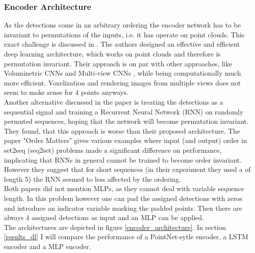 \documentclass[12pt,a4paper]{article}
\begin{document}
\subsubsection{Encoder Architecture}
\label{encoder}
As the detections come in an arbitrary ordering the encoder network has to be invariant to permutations of the inputs, i.e. it has operate on point clouds. This exact challenge is discussed in \cite{PointNet}. The authors designed an effective and efficient deep learning architecture, which works on point clouds and therefore is permutation invariant. Their approach is on par with other approaches, like Voluminetric CNNs \cite{VCNN} and Multi-view CNNs \cite{MVCNN}, while being computationally much more efficient. Voxelization and rendering images from multiple views does not seem to make sense for 4 points anyways.\\
Another alternative discussed in the paper is treating the detections as a sequential signal and training a Recurrent Neural Network (RNN) on randomly permuted sequences, hoping that the network will become permutation invariant. They found, that this approach is worse than their proposed architecture. The paper "Order Matters" \cite{orderMatters} gives various examples where input (and output) order in set2seq (seq2set) problems made a significant difference on performance, implicating that RNNs in general cannot be trained to become order invariant. However they suggest that for short  sequences (in their experiment they used a of length 5) the RNN seemed to less affected by the ordering.\\
Both papers did not mention MLPs, as they cannot deal with variable sequence length. In this problem however one can pad  the assigned detections with zeros and introduce an indicator variable masking the padded points. Then there are always 4 assigned detections as input and an MLP can be applied. \\
The architectures are depicted in figure \ref{encoder_architecture}.
In section \ref{results_dl} I will compare the performance of a PointNet-sytle encoder, a LSTM encoder and a MLP encoder.

\end{document}
